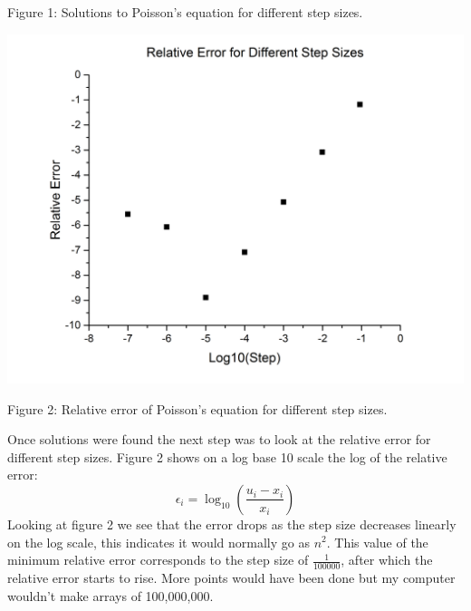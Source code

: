 \documentclass[12pt,righttag]{article}
\begin{document}
	Figure 1: Solutions to Poisson's equation for different step sizes.
	
	
	\includegraphics[scale=0.3]{relativeerror.png}
	
	Figure 2: Relative error of Poisson's equation for different step sizes.
	
	Once solutions were found the next step was to look at the relative error for different step sizes. Figure 2 shows on a log base 10 scale the log of the relative error:
	\[\epsilon_i=\log_{10}(\frac{u_i-x_i}{x_i})\]
	Looking at figure 2 we see that the error drops as the step size decreases linearly on the log scale, this indicates it would normally go as $n^2$. This value of the minimum relative error corresponds to the step size of $\frac{1}{100000}$, after which the relative error starts to rise. More points would have been done but my computer wouldn't make arrays of 100,000,000.
	
\end{document}
